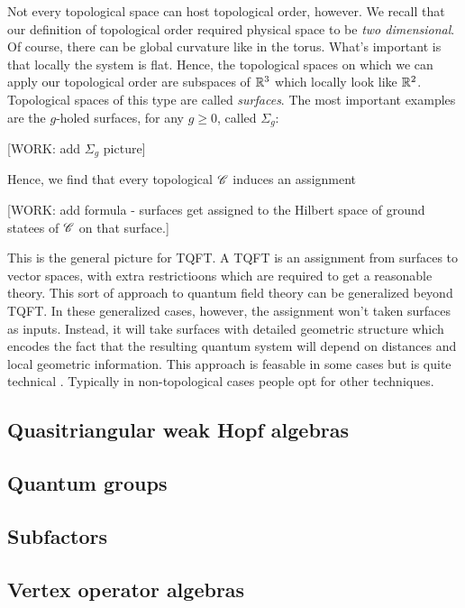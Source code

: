 \documentclass{article}
\theoremstyle{definition}
\numberwithin{figure}{section}
\begin{document}
Not every topological space can host topological order, however. We recall that our definition of topological order required physical space to be \textit{two dimensional}. Of course, there can be global curvature like in the torus. What's important is that locally the system is flat. Hence, the topological spaces on which we can apply our topological order are subspaces of $\mathbb{R}^3$ which locally look like $\mathbb{R}^2$. Topological spaces of this type are called \textit{surfaces}. The most important examples are the $g$-holed surfaces, for any $g\geq 0$, called $\Sigma_g$:

[WORK: add $\Sigma_g$ picture]

Hence, we find that every topological $\mathscr{C}$ induces an assignment

[WORK: add formula - surfaces get assigned to the Hilbert space of ground statees of $\mathscr{C}$ on that surface.]

This is the general picture for TQFT. A TQFT is an assignment from surfaces to vector spaces, with extra restrictioons which are required to get a reasonable theory. This sort of approach to quantum field theory can be generalized beyond TQFT. In these generalized cases, however, the assignment won't taken surfaces as inputs. Instead, it will take surfaces with detailed geometric structure which encodes the fact that the resulting quantum system will depend on distances and local geometric information. This approach is feasable in some cases but is quite technical \cite{segal1988definition}. Typically in non-topological cases people opt for other techniques.

\subsection{Quasitriangular weak Hopf algebras}

\subsection{Quantum groups}

\subsection{Subfactors}

\subsection{Vertex operator algebras}




\end{document}
